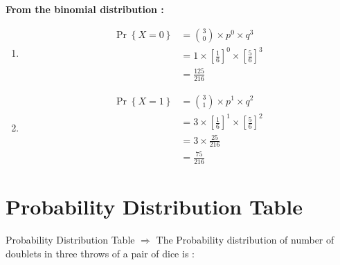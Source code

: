 \documentclass{beamer}
\newcounter{saveenumi}
\newcommand{\seti}{\setcounter{saveenumi}{\value{enumi}}}
\newcommand{\conti}{\setcounter{enumi}{\value{saveenumi}}}
\providecommand{\pr}[1]{\ensuremath{\Pr\left\{#1\right\}}}
\providecommand{\sbrak}[1]{\ensuremath{{}\left[#1\right]}}
\begin{document}
\begin{frame}
\textbf{From the binomial distribution :}\\
\begin{enumerate}
\item {
\begin{align}
\pr{X = 0} & = {3 \choose 0} \times p^0 \times q^3\\ & = 1 \times \sbrak{\frac{1}{6}}^0 \times \sbrak{\frac{5}{6}}^3\\ & = \frac{125}{216}
\end{align}}
\item {
\begin{align}
\pr{X = 1} & = {3 \choose 1} \times p^1 \times q^2\\ & = 3 \times \sbrak{\frac{1}{6}}^1 \times \sbrak{\frac{5}{6}}^2\\ & = 3 \times \frac{25}{216}\\ & = \frac{75}{216}
\end{align}}
\seti
\end{enumerate}
\end{frame}



\section{Probability Distribution Table}

\begin{frame}{Probability Distribution Table}
$\Rightarrow$ The Probability distribution of number of doublets in three throws of
a pair of dice is :
    \begin{block}{}
     \begin{table}[ht!]
    \centering
    
    \caption{Probability Distribution}
    \label{Tab:2}
\end{table}   
    \end{block}
\end{frame} 
\end{document}
